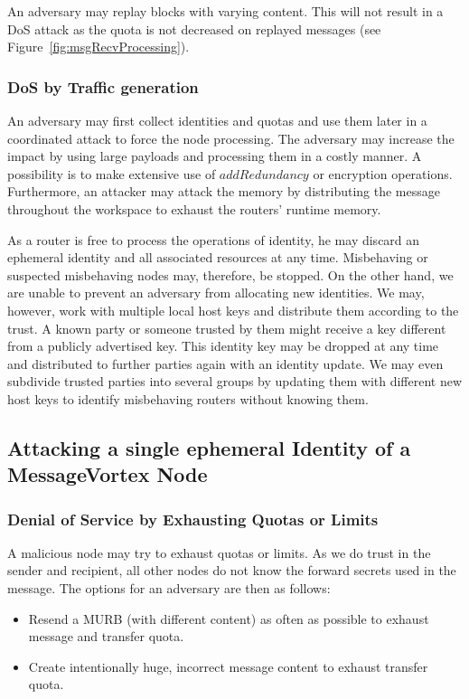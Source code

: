 An adversary may replay blocks with varying content. This will not result in a DoS attack as the quota is not decreased on replayed messages (see Figure~\ref{fig:msgRecvProcessing}).

\subsubsection{DoS by Traffic generation}
An adversary may first collect identities and quotas and use them later in a coordinated attack to force the node processing. The adversary may increase the impact by using large payloads and processing them in a costly manner. A possibility is to make extensive use of $addRedundancy$ or encryption operations. Furthermore, an attacker may attack the memory by distributing the message throughout the workspace to exhaust the routers' runtime memory.

As a router is free to process the operations of identity, he may discard an ephemeral identity and all associated resources at any time. Misbehaving or suspected misbehaving nodes may, therefore, be stopped. On the other hand, we are unable to prevent an adversary from allocating new identities. We may, however, work with multiple local host keys and distribute them according to the trust. A known party or someone trusted by them might receive a key different from a publicly advertised key. This identity key may be dropped at any time and distributed to further parties again with an identity update. We may even subdivide trusted parties into several groups by updating them with different new host keys to identify misbehaving routers without knowing them. 

\subsection{Attacking a single ephemeral Identity of a MessageVortex Node}

\subsubsection{Denial of Service by Exhausting Quotas or Limits}
A malicious node may try to exhaust quotas or limits. As we do trust in the sender and recipient, all other nodes do not know the forward secrets used in the message. The options for an adversary are then as follows:

\begin{itemize}
	\item Resend a MURB (with different content) as often as possible to exhaust message and transfer quota. 
	\item Create intentionally huge, incorrect message content to exhaust transfer quota.
\end{itemize}

